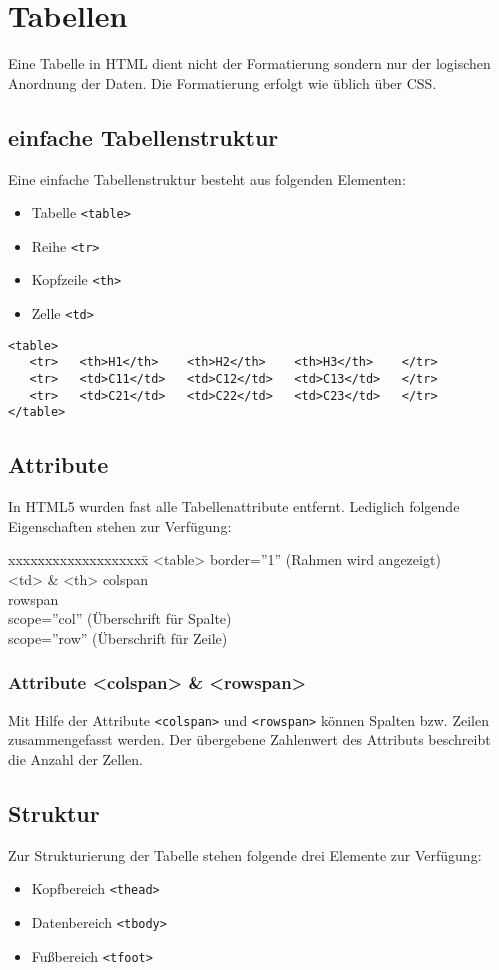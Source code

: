  \chapter{Tabellen}
Eine Tabelle in HTML dient nicht der Formatierung sondern nur der logischen Anordnung der Daten. Die Formatierung erfolgt wie üblich über CSS.
\section{einfache Tabellenstruktur}
Eine einfache Tabellenstruktur besteht aus folgenden Elementen:
\begin{itemize}
\item Tabelle \texttt{<table>}
\item Reihe \texttt{<tr>}
\item Kopfzeile \texttt{<th>}
\item Zelle \texttt{<td>}
\end{itemize}
\begin{lstlisting}[caption=''einfache Tabelle'']
<table>
   <tr>   <th>H1</th>    <th>H2</th>    <th>H3</th>    </tr>
   <tr>   <td>C11</td>   <td>C12</td>   <td>C13</td>   </tr>
   <tr>   <td>C21</td>   <td>C22</td>   <td>C23</td>   </tr>
</table>
\end{lstlisting}
\section{Attribute}
In HTML5 wurden fast alle Tabellenattribute entfernt. Lediglich folgende Eigenschaften stehen zur Verfügung:
\begin{tabbing}
xxxxxxxxxxxxxxxxxxx\=\kill
<table>		\>border=''1'' (Rahmen wird angezeigt)\\
<td> \& <th>	\>colspan\\
			\>rowspan\\
			\>scope=''col'' (Überschrift für Spalte)\\
			\>scope=''row'' (Überschrift für Zeile)\\
\end{tabbing}
\subsection{Attribute <colspan> \& <rowspan>}
Mit Hilfe der Attribute \texttt{<colspan>} und \texttt{<rowspan>} können Spalten bzw. Zeilen zusammengefasst werden. Der übergebene Zahlenwert des Attributs beschreibt die Anzahl der Zellen.
\section{Struktur}
Zur Strukturierung der Tabelle stehen folgende drei Elemente zur Verfügung:
\begin{itemize}
\item Kopfbereich \texttt{<thead>}
\item Datenbereich \texttt{<tbody>}
\item Fußbereich \texttt{<tfoot>}
\end{itemize}
